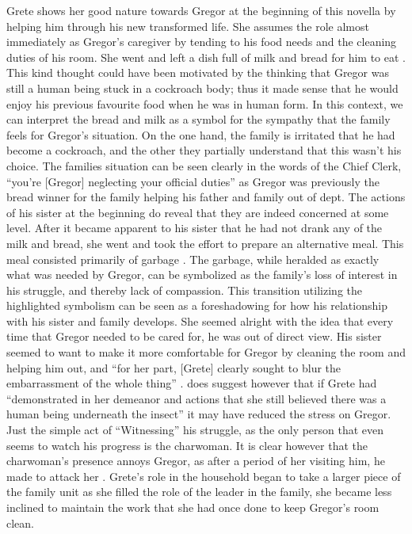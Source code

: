 \documentclass{article}
\begin{document}
Grete shows her good nature towards Gregor at the beginning of this novella
by helping him through his new transformed life. She assumes the role almost
immediately as Gregor's caregiver by tending to his food needs and the
cleaning duties of his room. She went and left a dish full of milk and bread
for him to eat \cite[106]{kafka2007meta}. This kind thought could have been
motivated by the thinking that Gregor was still a human being stuck in a
cockroach body; thus it made sense that he would enjoy his previous
favourite food when he was in human form. In this context, we can interpret 
the bread and milk as a symbol for the sympathy that the family feels for
Gregor's situation. On the one hand, the family is irritated that he had
become a cockroach, and the other they partially understand that this wasn't
his choice. The families situation can be seen clearly in the words of the
Chief Clerk, ``you're [Gregor] neglecting your official duties''
\cite[96]{kafka2007meta} as Gregor was previously the bread winner for the
family helping his father and family out of dept. The actions of his sister
at the beginning do reveal that they are indeed concerned at some level.
After it became apparent to his sister that he had not drank any of the milk
and bread, she went and took the effort to prepare an alternative meal. This
meal consisted primarily of garbage \cite[109]{kafka2007meta}. The garbage,
while heralded as exactly what was needed by Gregor, can be symbolized as
the family's loss of interest in his struggle, and thereby lack of
compassion. This transition utilizing the highlighted symbolism can be seen
as a foreshadowing for how his relationship with his sister and family
develops. She seemed alright with the idea that every time that Gregor
needed to be cared for, he was out of direct view. His sister seemed to want
to make it more comfortable for Gregor by cleaning the room and helping him
out, and ``for her part, [Grete] clearly sought to blur the embarrassment of
the whole thing'' \cite[115]{kafka2007meta}. \citeauthor{rowe2002} does
suggest however that if Grete had ``demonstrated in her demeanor and actions
that she still believed there was a human being underneath the insect''
\cite[277]{rowe2002} it may have reduced the stress on Gregor. Just the
simple act of ``Witnessing'' his struggle, as the only person that even
seems to watch his progress is the charwoman. It is clear however that the
charwoman's presence annoys Gregor, as after a period of her visiting him,
he made to attack her \cite[132]{kafka2007meta}. Grete's role in the
household began to take a larger piece of the family unit as she filled the
role of the leader in the family, she became less inclined to maintain the
work that she had once done to keep Gregor's room clean.
\end{document}
